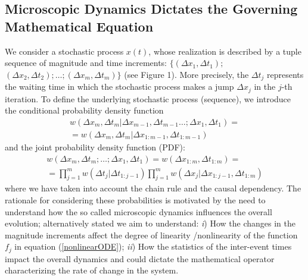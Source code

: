 \subsection{Microscopic Dynamics Dictates the Governing Mathematical Equation}
\label{s:Microscopic}
We consider a stochastic process $x(t)$, whose realization is described by a tuple sequence of magnitude and time increments: $ \{ (\Delta x_{1},\Delta t_{1});$ $ (\Delta x_{2},\Delta t_{2});\ldots ; (\Delta x_{m},\Delta t_{m}) \}$ (see Figure 1). More precisely, the $\Delta t_{j}$ represents the waiting time in which the stochastic process makes a jump $\Delta x_{j}$ in the $j$-th iteration. To define the underlying stochastic process (sequence), we introduce the conditional probability density function 
\begin{eqnarray}
w(\Delta x_{m},\Delta t_{m}|\Delta x_{m-1},\Delta t_{m-1}\ldots;\Delta x_{1},\Delta t_{1}) =  \nonumber\\
= w(\Delta x_{m},\Delta t_{m}|\Delta x_{1:m-1},\Delta t_{1:m-1})
\end{eqnarray}
and the joint probability density function (PDF):
\begin{eqnarray}
w(\Delta x_{m},\Delta t_{m};\ldots;\Delta x_{1},\Delta t_{1}) =  w(\Delta x_{1:m},\Delta t_{1:m}) =\nonumber\\
=  \prod\limits_{j=1}^{m} w(\Delta t_{j}|\Delta t_{1:j-1})\prod\limits_{j=1}^{m}w(\Delta x_{j}|\Delta x_{1:j-1},\Delta t_{1:m})
\end{eqnarray}
where we have taken into account the chain rule and the causal dependency. The rationale for considering these probabilities is motivated by the need to understand how the so called microscopic dynamics influences the overall evolution; alternatively stated we aim to understand: \textit{i}) How the changes in the magnitude increments affect the degree of linearity /nonlinearity of the function $f_{j}$ in equation (\ref{nonlinearODE}); \textit{ii}) How the statistics of the inter-event times impact the overall dynamics and could dictate the mathematical operator characterizing the rate of change in the system. 


